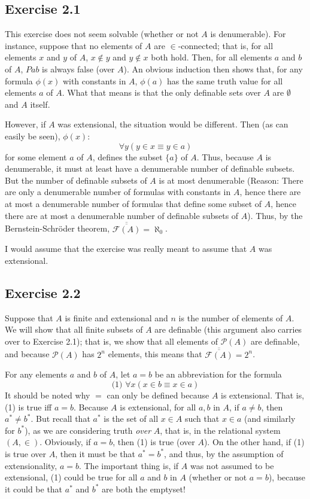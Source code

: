 \documentclass{article}
\theoremstyle{definition}
\begin{document}
\subsection*{Exercise 2.1}
This exercise does not seem solvable (whether or not $A$ is denumerable). For instance, suppose that no elements of 
$A$ are $\in$-connected; that is, for all elements $x$ and $y$ of $A$, $x\notin y$ and $y\notin x$ both hold.
Then, for all elements $a$ and $b$ of $A$, $Pab$ is always false (over $A$). An obvious induction then shows that, for 
any formula $\phi(x)$ with constants in $A$, $\phi(a)$ has the same truth value for all elements $a$ of 
$A$. What that means is that the only definable sets over $A$ are $\emptyset$ and $A$ itself.

However, if $A$ was extensional, the situation would be different. Then (as can easily be seen), 
$\phi(x)$: 
\[ \forall y(y\in x\equiv y\in a) \]
for some element $a$ of $A$, defines the subset $\{a\}$ of $A$. Thus, because $A$ is denumerable, it must at 
least have a denumerable number of definable subsets. But the number of definable subsets of $A$ is at most denumerable
(Reason: There are only a denumerable number of formulas with constants in $A$, hence there are at most a denumerable 
number of formulas that define some subset of $A$, hence there are at most a denumerable number of definable 
subsets of $A$). Thus, by the Bernstein-Schröder theorem, $\overline{\overline{\mathcal{F}(A)}}=\aleph_0$.

I would assume that the exercise was really meant to assume that $A$ was extensional.

\subsection*{Exercise 2.2}
Suppose that $A$ is finite and extensional and $n$ is the number of elements of $A$. We will show that all finite 
subsets of $A$ are definable (this argument also carries over to Exercise 2.1); that is, we show that 
all elements of $\mathcal{P}(A)$ are definable, and because $\mathcal{P}(A)$ has $2^n$ elements, this means that 
$\overline{\overline{\mathcal{F}(A)}}=2^n$.

For any elements $a$ and $b$ of $A$, let $a=b$ be an abbreviation for the formula
\[ \textrm{(1) }\forall x(x\in b\equiv x\in a) \]
It should be noted why $=$ can only be defined because $A$ is extensional. That is,
(1) is true iff $a=b$. Because $A$ is extensional, for all $a,b$ in $A$, 
if $a\ne b$, then $a^*\ne b^*$. But recall that $a^*$ is the set of all $x\in A$ such that 
$x\in a$ (and similarly for $b^*$),  
as we are considering truth \textit{over} $A$, that is, 
in the relational system $(A,\in)$. Obviously, if $a=b$, then (1) is true (over $A$). On the 
other hand, if (1) is true over $A$, then it must be that $a^*=b^*$, and thus, by the 
assumption of extensionality, $a=b$. The important thing is, if $A$ was not assumed to be 
extensional, (1) could be true for all $a$ and $b$ in $A$ (whether or not $a=b$), because 
it could be that $a^*$ and $b^*$ are both the emptyset!
\end{document}
